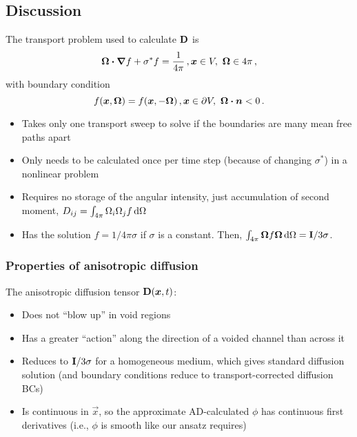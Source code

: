 \documentclass{beamer}
\begin{document}
\subsection{Discussion}
\begin{frame}
  The transport problem used to calculate $\mathbf{D}$ is
  \begin{equation*}
    \bm{\Omega}\bm{\cdot} \bm{\nabla} f + \sigma^* f = \frac{1}{4\pi} \,, \bm{x} \in V,\
    \bm{\Omega}\in 4\pi\,,
  \end{equation*}
  with boundary condition
  \begin{equation*}
    f(\bm{x}, \bm{\Omega}) = f(\bm{x}, -\bm{\Omega}) \,, \bm{x} \in
    \partial V,\ \bm{\Omega} \bm{\cdot} \bm{n} < 0\,.
  \end{equation*}
  \vspace{-\baselineskip}
  \begin{itemize}
    \item Takes only one transport sweep to solve if the boundaries are many
      mean free paths apart
    \item Only needs to be calculated once per time step (because of changing
      $\sigma^*$) in a nonlinear problem \item Requires no storage of the
      angular intensity, just accumulation of second moment, $D_{ij} =
      \int_{4\pi} \Omega_i \Omega_j f \mathop{}\!\mathrm{d}\Omega$
    \item Has the solution $f=1/4\pi\sigma$ if $\sigma$ is a constant.
      Then, $\int_{4\pi} \bm{\Omega} f \bm{\Omega} \mathop{}\!\mathrm{d}\Omega =
      \mathbf{I}/3\sigma$.
  \end{itemize}
\end{frame}

\begin{frame}
  \frametitle{Properties of anisotropic diffusion}

  The anisotropic diffusion tensor $\mathbf{D}(\bm{x},t)$: 
  \begin{itemize}
    \item Does not ``blow up'' in void regions
    \item Has a greater ``action'' along the direction of a voided channel than
      across it
    \item Reduces to $\mathbf{I}/3\sigma$ for a homogeneous
      medium, which gives standard diffusion solution (and boundary conditions
      reduce to transport-corrected diffusion BCs)
    \item Is continuous in $\vec{x}$, so the approximate AD-calculated $\phi$
      has continuous first derivatives (i.e., $\phi$ is smooth like our ansatz
      requires)
  \end{itemize}

\end{frame}
\end{document}
